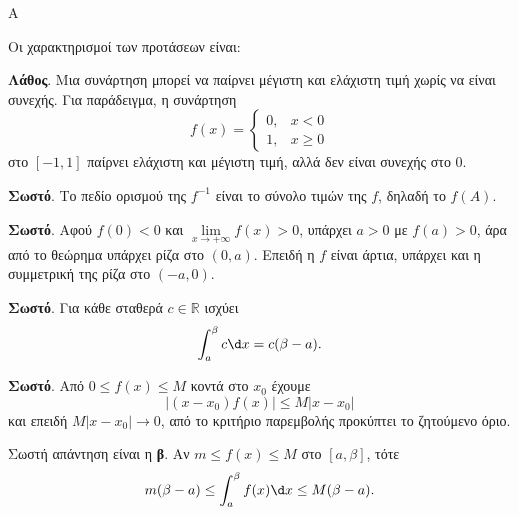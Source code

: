 \begin{thema}{Α}
\begin{erwthma}
\item {}

\item {}

\item {}

\item Οι χαρακτηρισμοί των προτάσεων είναι:
\begin{alist}
\item \textbf{Λάθος}. Μια συνάρτηση μπορεί να παίρνει μέγιστη και ελάχιστη τιμή χωρίς να είναι συνεχής. Για παράδειγμα, η συνάρτηση
\[ f(x)=\begin{cases}0, & x<0\\ 1, & x\ge0\end{cases} \]
στο $[-1,1]$ παίρνει ελάχιστη και μέγιστη τιμή, αλλά δεν είναι συνεχής στο $0$.
\item \textbf{Σωστό}. Το πεδίο ορισμού της $f^{-1}$ είναι το σύνολο τιμών της $f$, δηλαδή το $f(A)$.
\item \textbf{Σωστό}. Αφού $f(0)<0$ και $\lim\limits_{x\to+\infty}f(x)>0$, υπάρχει $a>0$ με $f(a)>0$, άρα από το θεώρημα  υπάρχει ρίζα στο $(0,a)$. Επειδή η $f$ είναι άρτια, υπάρχει και η συμμετρική της ρίζα στο $(-a,0)$.
\item \textbf{Σωστό}. Για κάθε σταθερά $c\in\mathbb{R}$ ισχύει
\[ \dint_a^\beta c\d x=c(\beta-a). \]
\item \textbf{Σωστό}. Από $0\le f(x)\le M$ κοντά στο $x_0$ έχουμε
\[ |(x-x_0)f(x)|\le M|x-x_0| \]
και επειδή $M|x-x_0|\to0$, από το κριτήριο παρεμβολής προκύπτει το ζητούμενο όριο.
\end{alist}

\item Σωστή απάντηση είναι η \textbf{β}. Αν $m\le f(x)\le M$ στο $[a,\beta]$, τότε
\[ m(\beta-a)\le\dint_a^\beta f(x)\d x\le M(\beta-a). \]
\end{erwthma}
\end{thema}

